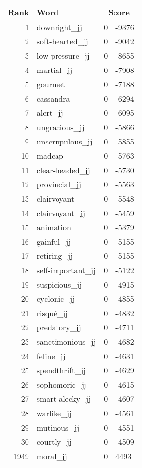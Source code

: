 \begin{longtable}[!htbp]{| rlr@{.}l |}
    \hline
    \textbf{Rank} & \textbf{Word} & \multicolumn{2}{c|}{\textbf{Score}} \\
    \hline
    \endhead
    1 & downright\_jj & 0 & -9376 \\
    2 & soft-hearted\_jj & 0 & -9042 \\
    3 & low-pressure\_jj & 0 & -8655 \\
    4 & martial\_jj & 0 & -7908 \\
    5 & gourmet & 0 & -7188 \\
    6 & cassandra & 0 & -6294 \\
    7 & alert\_jj & 0 & -6095 \\
    8 & ungracious\_jj & 0 & -5866 \\
    9 & unscrupulous\_jj & 0 & -5855 \\
    10 & madcap & 0 & -5763 \\
    11 & clear-headed\_jj & 0 & -5730 \\
    12 & provincial\_jj & 0 & -5563 \\
    13 & clairvoyant & 0 & -5548 \\
    14 & clairvoyant\_jj & 0 & -5459 \\
    15 & animation & 0 & -5379 \\
    16 & gainful\_jj & 0 & -5155 \\
    17 & retiring\_jj & 0 & -5155 \\
    18 & self-important\_jj & 0 & -5122 \\
    19 & suspicious\_jj & 0 & -4915 \\
    20 & cyclonic\_jj & 0 & -4855 \\
    21 & risqué\_jj & 0 & -4832 \\
    22 & predatory\_jj & 0 & -4711 \\
    23 & sanctimonious\_jj & 0 & -4682 \\
    24 & feline\_jj & 0 & -4631 \\
    25 & spendthrift\_jj & 0 & -4629 \\
    26 & sophomoric\_jj & 0 & -4615 \\
    27 & smart-alecky\_jj & 0 & -4607 \\
    28 & warlike\_jj & 0 & -4561 \\
    29 & mutinous\_jj & 0 & -4551 \\
    30 & courtly\_jj & 0 & -4509 \\
    1949 & moral\_jj & 0 & 4493 \\

\end{longtable}
